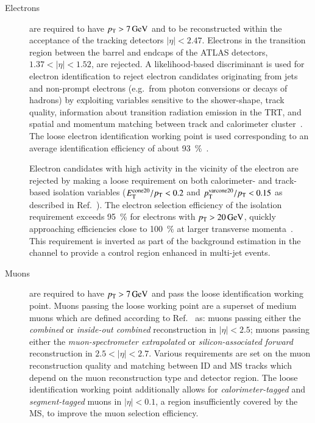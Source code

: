 \begin{description}

\item[Electrons] are required to have $\pT > \SI{7}{\GeV}$ and to be
  reconstructed within the acceptance of the tracking detectors
  $|\eta| < \num{2.47}$. Electrons in the transition region between
  the barrel and endcaps of the ATLAS detectors,
  $1.37 < |\eta| < 1.52$, are rejected. A likelihood-based
  discriminant is used for electron identification to reject electron
  candidates originating from jets and non-prompt electrons (e.g.\
  from photon conversions or decays of hadrons) by exploiting
  variables sensitive to the shower-shape, track quality, information
  about transition radiation emission in the TRT, and spatial and
  momentum matching between track and calorimeter
  cluster~\cite{EGAM-2018-01}. The loose electron identification
  working point is used corresponding to an average identification
  efficiency of about \SI{93}{\percent}~\cite{EGAM-2018-01}.

  Electron candidates with high activity in the vicinity of the
  electron are rejected by making a loose requirement on both
  calorimeter- and track-based isolation variables
  ($E_{\text{T}}^\text{cone20} / p_{\text{T}} < 0.2$ and
  $p_{\text{T}}^{\text{varcone20}}/ p_{\text{T}} < 0.15$ as described in
  Ref.~\cite{EGAM-2018-01}). The electron selection efficiency of the
  isolation requirement exceeds \SI{95}{\percent} for electrons with
  $\pT > \SI{20}{\GeV}$, quickly approaching efficiencies close to
  \SI{100}{\percent} at larger transverse
  momenta~\cite{EGAM-2018-01}. This requirement is inverted as part of
  the \faketauhadvis background estimation in the \lephad channel to
  provide a control region enhanced in multi-jet events.



\item[Muons] are required to have $\pT > \SI{7}{\GeV}$ and pass the
  loose identification working point. Muons passing the loose working
  point are a superset of medium muons which are defined according to
  Ref.~\cite{MUON-2018-03} as: muons passing either the
  \emph{combined} or \emph{inside-out combined} reconstruction in
  $|\eta| < 2.5$; muons passing either the \emph{muon-spectrometer
    extrapolated} or \emph{silicon-associated forward} reconstruction
  in $2.5 < |\eta| < 2.7$. Various requirements are set on the muon
  reconstruction quality and matching between ID and MS tracks which
  depend on the muon reconstruction type and detector region. The
  loose identification working point additionally allows for
  \emph{calorimeter-tagged} and \emph{segment-tagged} muons in
  $|\eta| < 0.1$, a region insufficiently covered by the MS, to
  improve the muon selection efficiency.


\end{description}
